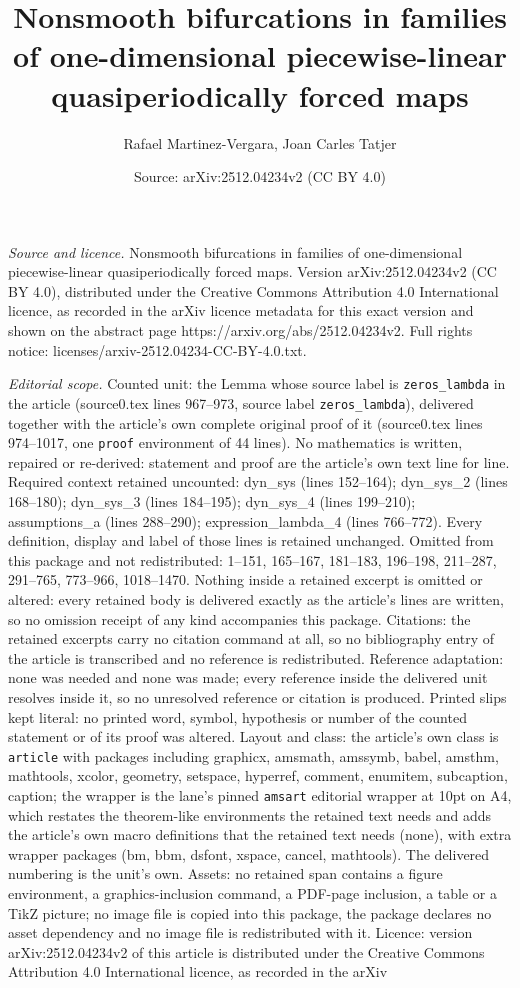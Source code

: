 \documentclass[10pt,a4paper]{amsart}
\title[Nonsmooth bifurcations in families of one-dimensional piecew]{Nonsmooth bifurcations in families of one-dimensional piecewise-linear quasiperiodically forced maps}
\author{Rafael Martinez-Vergara, Joan Carles Tatjer}
\date{Source: arXiv:2512.04234v2 (CC BY 4.0)}
\begin{document}
\maketitle

\noindent\emph{Source and licence.} Nonsmooth bifurcations in families of one-dimensional piecewise-linear quasiperiodically forced maps. Version arXiv:2512.04234v2 (CC BY 4.0), distributed under the Creative Commons Attribution 4.0 International licence, as recorded in the arXiv licence metadata for this exact version and shown on the abstract page https://arxiv.org/abs/2512.04234v2. Full rights notice: licenses/arxiv-2512.04234-CC-BY-4.0.txt.\par\smallskip

\noindent\textit{Editorial scope.} Counted unit: the Lemma whose source label is \texttt{zeros\_lambda} in the article (source0.tex lines 967--973, source label \texttt{zeros\_lambda}), delivered together with the article's own complete original proof of it (source0.tex lines 974--1017, one \texttt{proof} environment of 44 lines). No mathematics is written, repaired or re-derived: statement and proof are the article's own text line for line. Required context retained uncounted: dyn\_sys (lines 152--164); dyn\_sys\_2 (lines 168--180); dyn\_sys\_3 (lines 184--195); dyn\_sys\_4 (lines 199--210); assumptions\_a (lines 288--290); expression\_lambda\_4 (lines 766--772). Every definition, display and label of those lines is retained unchanged. Omitted from this package and not redistributed: 1--151, 165--167, 181--183, 196--198, 211--287, 291--765, 773--966, 1018--1470. Nothing inside a retained excerpt is omitted or altered: every retained body is delivered exactly as the article's lines are written, so no omission receipt of any kind accompanies this package. Citations: the retained excerpts carry no citation command at all, so no bibliography entry of the article is transcribed and no reference is redistributed. Reference adaptation: none was needed and none was made; every reference inside the delivered unit resolves inside it, so no unresolved reference or citation is produced. Printed slips kept literal: no printed word, symbol, hypothesis or number of the counted statement or of its proof was altered. Layout and class: the article's own class is \texttt{article} with packages including graphicx, amsmath, amssymb, babel, amsthm, mathtools, xcolor, geometry, setspace, hyperref, comment, enumitem, subcaption, caption; the wrapper is the lane's pinned \texttt{amsart} editorial wrapper at 10pt on A4, which restates the theorem-like environments the retained text needs and adds the article's own macro definitions that the retained text needs (none), with extra wrapper packages (bm, bbm, dsfont, xspace, cancel, mathtools). The delivered numbering is the unit's own. Assets: no retained span contains a figure environment, a graphics-inclusion command, a PDF-page inclusion, a table or a TikZ picture; no image file is copied into this package, the package declares no asset dependency and no image file is redistributed with it. Licence: version arXiv:2512.04234v2 of this article is distributed under the Creative Commons Attribution 4.0 International licence, as recorded in the arXiv 
\end{document}
